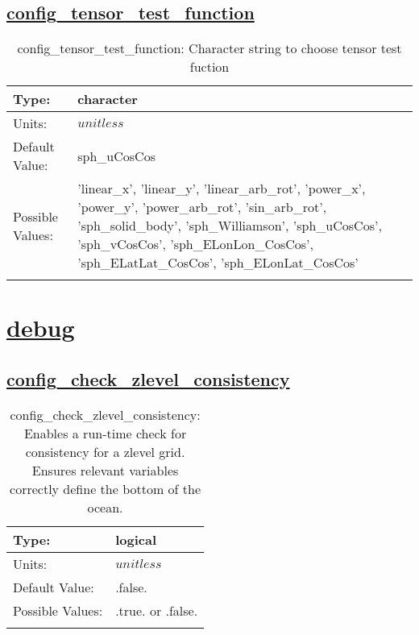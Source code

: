 \subsection[config\_tensor\_test\_function]{\hyperref[sec:nm_tab_testing]{config\_tensor\_test\_function}}
\label{subsec:nm_sec_config_tensor_test_function}
\begin{center}
\begin{longtable}{| p{2.0in} | p{4.0in} |}
    \hline
    Type: & character \\
    \hline
    Units: & $unitless$ \\
    \hline
    Default Value: & sph\_uCosCos \\
    \hline
    Possible Values: & 'linear\_x', 'linear\_y', 'linear\_arb\_rot', 'power\_x', 'power\_y', 'power\_arb\_rot', 'sin\_arb\_rot', 'sph\_solid\_body', 'sph\_Williamson', 'sph\_uCosCos', 'sph\_vCosCos', 'sph\_ELonLon\_CosCos', 'sph\_ELatLat\_CosCos', 'sph\_ELonLat\_CosCos' \\
    \hline
    \caption{config\_tensor\_test\_function: Character string to choose tensor test fuction}
\end{longtable}
\end{center}
\section[debug]{\hyperref[sec:nm_tab_debug]{debug}}
\label{sec:nm_sec_debug}
\subsection[config\_check\_zlevel\_consistency]{\hyperref[sec:nm_tab_debug]{config\_check\_zlevel\_consistency}}
\label{subsec:nm_sec_config_check_zlevel_consistency}
\begin{center}
\begin{longtable}{| p{2.0in} | p{4.0in} |}
    \hline
    Type: & logical \\
    \hline
    Units: & $unitless$ \\
    \hline
    Default Value: & .false. \\
    \hline
    Possible Values: & .true. or .false. \\
    \hline
    \caption{config\_check\_zlevel\_consistency: Enables a run-time check for consistency for a zlevel grid. Ensures relevant variables correctly define the bottom of the ocean.}
\end{longtable}
\end{center}
